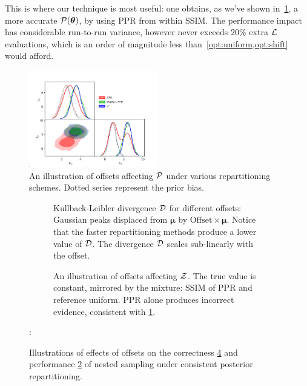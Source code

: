 \documentclass[usenatbib]{mnras}
\begin{document}
This is where our technique is most useful: one obtains, as we've
shown in~\cref{fig:convergence}, a more accurate
\({\cal P}(\bm{\theta})\), by using PPR from within SSIM. The
performance impact has considerable run-to-run variance, however never
exceeds \(20\%\) extra \({\cal L}\) evaluations, which is an order of
magnitude less than~\vref{opt:uniform,opt:shift} would afford.

\begin{figure}
\includegraphics[width=0.5\textwidth]{./illustrations/convergence.pdf}
\caption{An illustration of offsets affecting ${\cal P}$ under various
  repartitioning schemes. Dotted series represent the prior
  bias. \label{fig:convergence}}
\end{figure}

\begin{figure} \centering
  \begin{subfigure}{0.86\columnwidth}
    \centering

    
    \caption{Kullback-Leibler divergence \({\cal D}\) for different
      offsets: Gaussian peaks displaced from \(\bm{\mu}\) by
      \(\text{Offset}\times \bm{\mu}\). Notice that the faster
      repartitioning methods produce a lower value of \({\cal
        D}\). The divergence \({\cal D}\) scales sub-linearly with the
      offset.\label{fig:kl-d}}
\end{subfigure}

\begin{subfigure}{0.86\columnwidth}
  \centering

  
  
  \caption{An illustration of offsets affecting ${\cal Z}$. The true
    value is constant, mirrored by the mixture: SSIM of PPR and
    reference uniform. PPR alone produces incorrect evidence,
    consistent with \cref{fig:convergence}. \label{fig:drift}}
\end{subfigure}
\caption{Illustrations of effects of offsets on the correctness
  \ref{fig:drift} and performance \ref{fig:kl-d} of nested sampling
  under consistent posterior repartitioning.}
:\end{figure}
\end{document}
